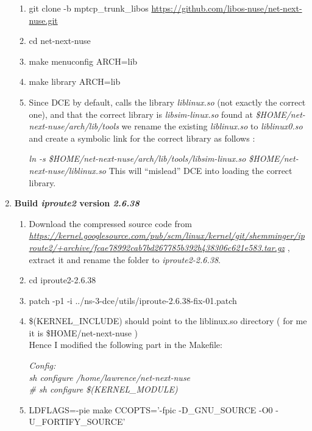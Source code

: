 \documentclass[a4paper,11pt]{article}
\begin{document}
\begin{enumerate}
\begin{enumerate}
					\item git clone -b mptcp\_trunk\_libos \url{https://github.com/libos-nuse/net-next-nuse.git}
					\item cd net-next-nuse
					\item make menuconfig ARCH=lib
					\item make library ARCH=lib
					\item Since DCE by default, calls the library \emph{liblinux.so} (not exactly the correct one), and that the correct library is \emph{libsim-linux.so} found at \emph{\$HOME/net-next-nuse/arch/lib/tools} we rename the existing \emph{liblinux.so} to \emph{liblinux0.so} and create a symbolic link for the correct library as follows :

					\emph{ln -s \$HOME/net-next-nuse/arch/lib/tools/libsim-linux.so \$HOME/net-next-nuse/liblinux.so}
					This will ``mislead'' DCE into loading the correct library.

				\end{enumerate}

			\item \textbf{Build \emph{iproute2} version \emph{2.6.38}}

				\begin{enumerate}
					\sloppy
					\item Download the compressed source code from \\
					\nohyphens{\emph{\url{https://kernel.googlesource.com/pub/scm/linux/kernel/git/shemminger/iproute2/+archive/fcae78992cab7bd267785b392b438306c621e583.tar.gz}}} , extract it and rename the folder to \emph{iproute2-2.6.38}. 
					\item cd iproute2-2.6.38
					\item patch -p1 -i ../ns-3-dce/utils/iproute-2.6.38-fix-01.patch
					\item \$(KERNEL\_INCLUDE) should point to the liblinux.so directory ( for me it is \$HOME/net-next-nuse ) \\
					Hence I modified the following part in the Makefile:

					\emph{
					Config: \\
	                   \hspace*{2cm}sh configure /home/lawrence/net-next-nuse \\
	                   \hspace*{2cm}\# sh configure \$(KERNEL\_MODULE) }
	                \item \raggedright{LDFLAGS=-pie make CCOPTS='-fpic -D\_GNU\_SOURCE -O0 -U\_FORTIFY\_SOURCE'}


\end{enumerate}
\end{enumerate}
\end{document}
